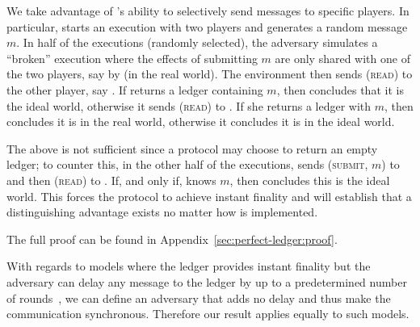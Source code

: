   \begin{proofsketch}
    We take advantage of \perfectadv's ability to selectively send messages to
    specific players. In particular, \perfectenv{} starts an execution with two
    players and generates a random message $m$. In half of the executions
    (randomly selected),  the adversary simulates a ``broken''  \perfectprot{}
    execution where the effects of submitting $m$ are only shared with one of
    the two players, say \alice{} by \perfectadv{} (in the real world). The
    environment then sends (\textsc{read}) to the other player, say \bob. If
    \bob{} returns a ledger containing $m$, then \perfectenv{} concludes that it
    is the ideal world, otherwise it sends (\textsc{read}) to \alice. If she
    returns a ledger with $m$, then \perfectenv{} concludes it is in the real
    world, otherwise it concludes it is in the ideal world.

    The above is not sufficient since a protocol may choose to return an empty
    ledger; to counter this, in the other half of the executions, \perfectenv{}
    sends (\textsc{submit}, $m$) to \alice{} and then (\textsc{read}) to \bob.
    If, and only if, \bob{} knows $m$, then \perfectenv{} concludes this is the
    ideal world. This forces the \perfectprot{} protocol to achieve instant
    finality and will establish that a distinguishing advantage exists no matter
    how \perfectprot{} is implemented.
  \end{proofsketch}

  The full proof can be found in Appendix~\ref{sec:perfect-ledger:proof}.

  With regards to models where the ledger provides instant finality but the
  adversary can delay any message to the ledger by up to a predetermined number
  of rounds~\cite{DBLP:conf/ccs/DziembowskiFH18}, we can define an adversary
  that adds no delay and thus make the communication synchronous. Therefore our
  result applies equally to such models.
